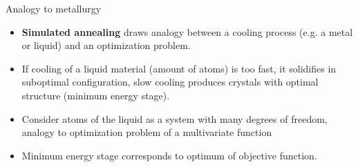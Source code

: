 \documentclass[11pt,compress,t,notes=noshow, xcolor=table]{beamer}
\begin{document}

\begin{vbframe}{Analogy to metallurgy}
    
\begin{itemize}
\item \textbf{Simulated annealing} draws analogy between a cooling process (e.g. a metal or liquid) and an optimization problem.
\item If cooling of a liquid material (amount of atoms) is too fast, it solidifies in suboptimal configuration, slow cooling produces crystals with optimal structure (minimum energy stage).
\item Consider atoms of the liquid as a system with many degrees of freedom, analogy to optimization problem of a multivariate function
\item Minimum energy stage corresponds to optimum of objective function.

\end{itemize}
\end{vbframe}

\endlecture
\end{document}

